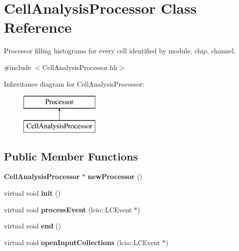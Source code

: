 \section{Cell\-Analysis\-Processor Class Reference}
\label{classCellAnalysisProcessor}


Processor filling histograms for every cell identified by module, chip, channel.  




{\ttfamily \#include $<$Cell\-Analysis\-Processor.\-hh$>$}

Inheritance diagram for Cell\-Analysis\-Processor\-:\begin{figure}[H]
\begin{center}
\leavevmode
\includegraphics[height=2.000000cm]{classCellAnalysisProcessor}
\end{center}
\end{figure}
\subsection*{Public Member Functions}
\begin{DoxyCompactItemize}
\item 
{\bf Cell\-Analysis\-Processor} $\ast$ {\bfseries new\-Processor} ()\label{classCellAnalysisProcessor_a06ea545c77c9679962952e4ecc85036e}

\item 
virtual void {\bfseries init} ()\label{classCellAnalysisProcessor_a1b00ce42ce45eba2ec8837e56387fde1}

\item 
virtual void {\bfseries process\-Event} (lcio\-::\-L\-C\-Event $\ast$)\label{classCellAnalysisProcessor_ae6c3b8b71f97e13388f02abfd25ce93d}

\item 
virtual void {\bfseries end} ()\label{classCellAnalysisProcessor_a0cdbbf21c86f123832b12bf55f0c89cd}

\item 
virtual void {\bfseries open\-Input\-Collections} (lcio\-::\-L\-C\-Event $\ast$)\label{classCellAnalysisProcessor_aa3ce692d4c2f4c14653c0bebf9233b98}

\end{DoxyCompactItemize}
